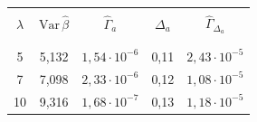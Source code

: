 \begin{table}\small %


\begin{center}


\parbox{210pt}{





}





\vspace*{2ex}





\begin{tabular}{|c|c|c|c|c|}


\hline


&&&&\\[-9pt]


$\lambda$& $\mathrm{Var} \,\hat{\beta}$ &  ${\hat\Gamma}_{a}$  & ${\Delta}_{a}$ & 


${\hat\Gamma}_{{\Delta}_{a}}$ \\


&&&&\\[-9pt]  


\hline


&&&&\\[-9pt]


 5&5,132 & $ 1{,}54 \cdot 10^{-6} $& 0,11 & $2{,}43 \cdot 10^{-5} $\\




7&7,098 &  $2{,}33 \cdot 10^{-6} $&  0,12 &$ 1{,}08 \cdot 10^{-5}$   \\




10\hphantom{9}&9,316 &$ 1{,}68 \cdot 10^{-7} $& 0,13 & $1{,}18 \cdot 10^{-5}$ \\


\hline


\end{tabular}


\end{center}


\vspace*{-12pt}


\end{table}





